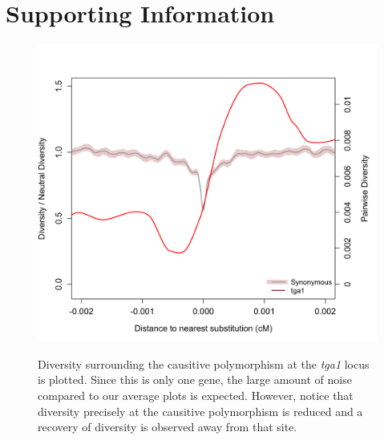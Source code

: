 \section*{Supporting Information}
\renewcommand\thefigure{S\arabic{figure}}    
\setcounter{figure}{0}


\begin{figure}
  \begin{center}
    \includegraphics[width=.85\textwidth]{FigsAndFiles/plotDiversity_TvM_Folded2_Significance_tga1Supp_June.png} \\
    \end{center}
\caption{Diversity surrounding the causitive polymorphism at the \emph{tga1} locus is plotted. Since this is only one gene, the large amount of noise compared to our average plots is expected. However, notice that diversity precisely at the causitive polymorphism is reduced and a recovery of diversity is observed away from that site. \label{sFig:tga1}}
\end{figure}
\clearpage


